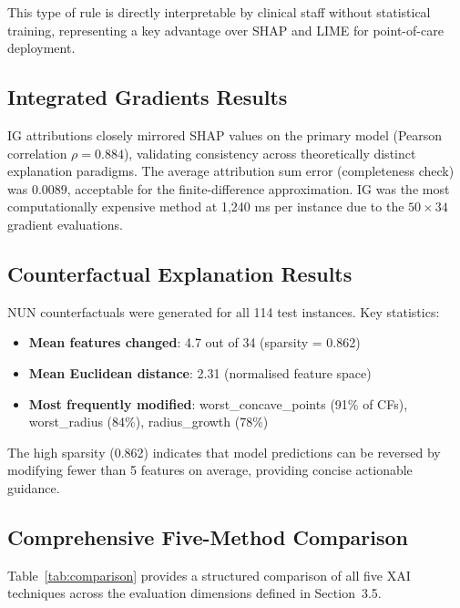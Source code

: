 \documentclass[journal]{IEEEtran}
\begin{document}
This type of rule is directly interpretable by clinical staff without statistical training, representing a key advantage over SHAP and LIME for point-of-care deployment.

\subsection{Integrated Gradients Results}

IG attributions closely mirrored SHAP values on the primary model (Pearson correlation $\rho = 0.884$), validating consistency across theoretically distinct explanation paradigms. The average attribution sum error (completeness check) was $0.0089$, acceptable for the finite-difference approximation. IG was the most computationally expensive method at 1,240 ms per instance due to the $50 \times 34$ gradient evaluations.

\subsection{Counterfactual Explanation Results}

NUN counterfactuals were generated for all 114 test instances. Key statistics:

\begin{itemize}
\item \textbf{Mean features changed}: 4.7 out of 34 (sparsity = 0.862)
\item \textbf{Mean Euclidean distance}: 2.31 (normalised feature space)
\item \textbf{Most frequently modified}: worst\_concave\_points (91\% of CFs), worst\_radius (84\%), radius\_growth (78\%)
\end{itemize}

The high sparsity (0.862) indicates that model predictions can be reversed by modifying fewer than 5 features on average, providing concise actionable guidance.

\subsection{Comprehensive Five-Method Comparison}

Table~\ref{tab:comparison} provides a structured comparison of all five XAI techniques across the evaluation dimensions defined in Section~3.5.
\end{document}
